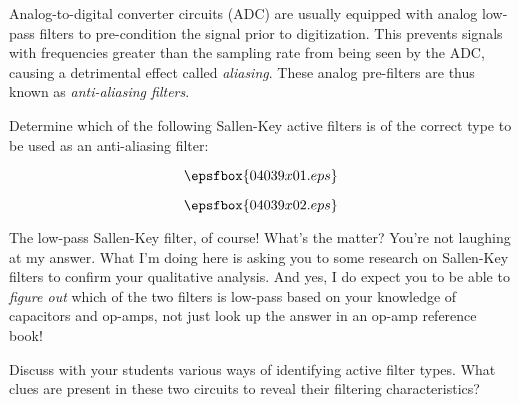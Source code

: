 

Analog-to-digital converter circuits (ADC) are usually equipped with analog low-pass filters to pre-condition the signal prior to digitization.  This prevents signals with frequencies greater than the sampling rate from being seen by the ADC, causing a detrimental effect called {\it aliasing}.  These analog pre-filters are thus known as {\it anti-aliasing filters}.

Determine which of the following Sallen-Key active filters is of the correct type to be used as an anti-aliasing filter:

$$\epsfbox{04039x01.eps}$$

$$\epsfbox{04039x02.eps}$$







The low-pass Sallen-Key filter, of course!  What's the matter?  You're not laughing at my answer.  What I'm doing here is asking you to some research on Sallen-Key filters to confirm your qualitative analysis.  And yes, I do expect you to be able to {\it figure out} which of the two filters is low-pass based on your knowledge of capacitors and op-amps, not just look up the answer in an op-amp reference book!







Discuss with your students various ways of identifying active filter types.  What clues are present in these two circuits to reveal their filtering characteristics?




